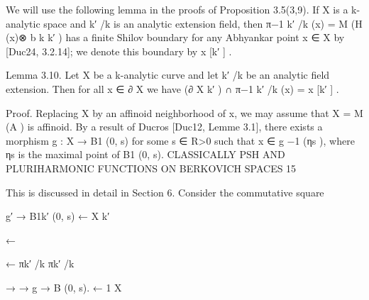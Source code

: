 \documentclass[
  10pt,
]{article}
\newenvironment{Shaded}{}{}
\newcommand{\NormalTok}[1]{#1}
\begin{document}
\begin{Shaded}
\begin{Highlighting}[]
\NormalTok{  We will use the following lemma in the proofs of Proposition 3.5(3,9). If X is a k{-}}
\NormalTok{analytic space and k′ /k is an analytic extension field, then π−1}
\NormalTok{                                                               k′ /k}
\NormalTok{                                                                     (x) = M (H (x)⊗}
\NormalTok{                                                                                   b k k′ )}
\NormalTok{has a finite Shilov boundary for any Abhyankar point x ∈ X by [Duc24, 3.2.14]; we}
\NormalTok{denote this boundary by x [k′ ] .}

\NormalTok{Lemma 3.10. Let X be a k{-}analytic curve and let k′ /k be an analytic field extension. Then}
\NormalTok{for all x ∈ ∂ X we have (∂ X k′ ) ∩ π−1}
\NormalTok{                                     k′ /k}
\NormalTok{                                           (x) = x [k′ ] .}

\NormalTok{Proof. Replacing X by an affinoid neighborhood of x, we may assume that X = M (A )}
\NormalTok{is affinoid. By a result of Ducros [Duc12, Lemme 3.1], there exists a morphism g : X →}
\NormalTok{B1 (0, s) for some s ∈ R\textgreater{}0 such that x ∈ g −1 (ηs ), where ηs is the maximal point of B1 (0, s).}
\NormalTok{                CLASSICALLY PSH AND PLURIHARMONIC FUNCTIONS ON BERKOVICH SPACES                                 15}

\NormalTok{This is discussed in detail in Section 6. Consider the commutative square}

\NormalTok{                                                          g′}
\NormalTok{                                                           → B1k′ (0, s)}
\NormalTok{                                                      ←}
\NormalTok{                                               X k′}




\NormalTok{                                                ←}




\NormalTok{                                                                  ←}
\NormalTok{                                           πk′ /k                   πk′ /k}




\NormalTok{                                                                 →}
\NormalTok{                                               →}
\NormalTok{                                                          g → B (0, s).}
\NormalTok{                                                      ←        1}
\NormalTok{                                                X}


\end{Highlighting}
\end{Shaded}
\end{document}
